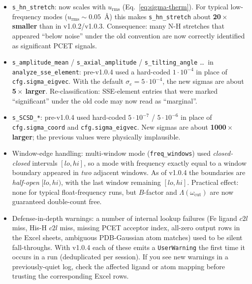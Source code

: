 \documentclass[11pt,a4paper,twoside]{article}
\newcommand{\urms}{u_{\mathrm{rms}}}
\theoremstyle{remark}
\begin{document}
\begin{itemize}\setlength{\itemsep}{2pt}
  \item \texttt{s\_hn\_stretch}: now scales with $\urms$
        (Eq.~\ref{eq:sigma-therm}). For typical low-frequency modes
        ($\urms \sim 0.05$~\AA) this makes \texttt{s\_hn\_stretch}
        about \textbf{20\,$\times$ smaller} than in v1.0.2/v1.0.3.
        Consequence: many N-H stretches that appeared
        ``below noise'' under the old convention are now correctly
        identified as significant PCET signals.
  \item \texttt{s\_amplitude\_mean} / \texttt{s\_axial\_amplitude} /
        \texttt{s\_tilting\_angle} \ldots\ in
        \texttt{analyze\_sse\_element}: pre-v1.0.4 used a hard-coded
        $1\cdot 10^{-4}$ in place of \texttt{cfg.sigma\_eigvec}.
        With the default $\sigma_e = 5\cdot 10^{-4}$, the new sigmas
        are about \textbf{5\,$\times$ larger}. Re-classification:
        SSE-element entries that were marked ``significant'' under
        the old code may now read as ``marginal''.
  \item \texttt{s\_SCSD\_*}: pre-v1.0.4 used hard-coded
        $5\cdot 10^{-7}$ / $5\cdot 10^{-6}$ in place of
        \texttt{cfg.sigma\_coord} and \texttt{cfg.sigma\_eigvec}.
        New sigmas are about \textbf{1000\,$\times$ larger}; the
        previous values were physically implausible.
  \item Window-edge handling: multi-window mode
        (\texttt{freq\_windows}) used \emph{closed-closed} intervals
        $[lo, hi]$, so a mode with frequency exactly equal to a
        window boundary appeared in \emph{two} adjacent windows. As
        of v1.0.4 the boundaries are \emph{half-open} $[lo, hi)$,
        with the last window remaining $[lo, hi]$. Practical effect:
        none for typical float-frequency runs, but
        $B$-factor and $\Lambda(\omega_\text{cut})$ are now
        guaranteed double-count free.
  \item Defense-in-depth warnings: a number of internal lookup
        failures (Fe ligand $c2l$ miss, His-H $c2l$ miss, missing
        PCET acceptor index, all-zero output rows in the Excel
        sheets, ambiguous PDB-Gaussian atom matches) used to be
        silent fall-throughs. With v1.0.4 each of these emits a
        \texttt{UserWarning} the first time it occurs in a run
        (deduplicated per session). If you see new warnings in a
        previously-quiet log, check the affected ligand or atom
        mapping before trusting the corresponding Excel rows.

\end{itemize}
\end{document}
